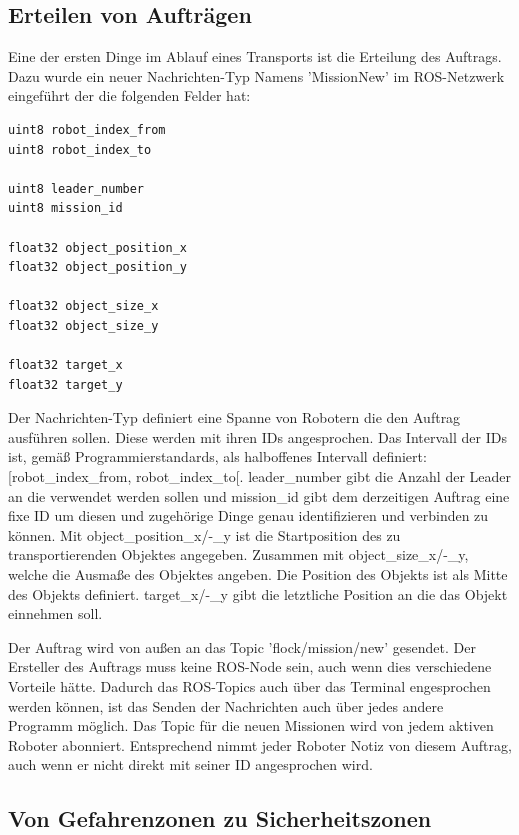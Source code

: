 \subsection*{Erteilen von Aufträgen}

Eine der ersten Dinge im Ablauf eines Transports ist die Erteilung des Auftrags. Dazu wurde ein neuer Nachrichten-Typ Namens 'MissionNew' im ROS-Netzwerk eingeführt der die folgenden Felder hat:

\begin{lstlisting}[frame=L]
uint8 robot_index_from
uint8 robot_index_to

uint8 leader_number
uint8 mission_id

float32 object_position_x
float32 object_position_y

float32 object_size_x
float32 object_size_y

float32 target_x
float32 target_y
\end{lstlisting}

Der Nachrichten-Typ definiert eine Spanne von Robotern die den Auftrag ausführen sollen. Diese werden mit ihren IDs angesprochen. Das Intervall der IDs ist, gemäß Programmierstandards, als halboffenes Intervall definiert: [robot\_index\_from, robot\_index\_to[.
leader\_number gibt die Anzahl der Leader an die verwendet werden sollen und mission\_id gibt dem derzeitigen Auftrag eine fixe ID um diesen und zugehörige Dinge genau identifizieren und verbinden zu können.
Mit object\_position\_x/-\_y ist die Startposition des zu transportierenden Objektes angegeben. Zusammen mit object\_size\_x/-\_y, welche die Ausmaße des Objektes angeben. Die Position des Objekts ist als Mitte des Objekts definiert.
target\_x/-\_y gibt die letztliche Position an die das Objekt einnehmen soll.

Der Auftrag wird von außen an das Topic 'flock/mission/new' gesendet. Der Ersteller des Auftrags muss keine ROS-Node sein, auch wenn dies verschiedene Vorteile hätte. Dadurch das ROS-Topics auch über das Terminal engesprochen werden können, ist das Senden der Nachrichten auch über jedes andere Programm möglich. Das Topic für die neuen Missionen wird von jedem aktiven Roboter abonniert. Entsprechend nimmt jeder Roboter Notiz von diesem Auftrag, auch wenn er nicht direkt mit seiner ID angesprochen wird.

\subsection*{Von Gefahrenzonen zu Sicherheitszonen}

